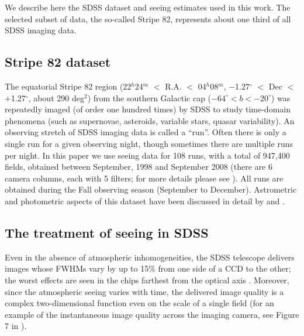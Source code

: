 

We describe here the SDSS dataset and seeing estimates used in this work. The
selected subset of data, the so-called Stripe 82, represents about one third of
all SDSS imaging data. 

\subsection{Stripe 82 dataset} 

The equatorial Stripe 82 region (22$^h$24$^m$ $<$ R.A. $<$ 04$^h$08$^m$, 
$-$1.27$^\circ$  $<$ Dec $<$ $+$1.27$^\circ$, about 
290 deg$^2$) from the southern Galactic cap ($-64^\circ < b <  -20^\circ$) was repeatedly imaged (of order
one hundred times) by SDSS to study time-domain phenomena (such as supernovae, asteroids, variable stars, quasar 
variability).  An observing stretch of SDSS imaging data is called a ``run''. Often there is only a single
run for a given observing night, though sometimes there are multiple
runs per night. In this paper we use seeing data for 
108 runs, with a total of 947,400 fields, obtained between September,
1998 and September 2008 (there are 6 camera columns, each with 5 filters; for more
details please see \citealt{Gunn2006}). All runs are obtained during the Fall observing season (September to 
December). Astrometric and photometric aspects of this dataset have been discussed in detail by 
\cite{Ivezic2007} and \cite{Sesar2007}. 


\subsection{The treatment of seeing in SDSS}
 
Even in the absence of atmospheric inhomogeneities, the SDSS telescope delivers images whose 
FWHMs vary by up to 15\% from one side of a CCD to the other; the worst effects are seen in 
the chips farthest from the optical axis \citep{Gunn2006}. Moreover, since the atmospheric 
seeing varies with time, the delivered image quality is a complex two-dimensional function 
even on the scale of a single field (for an example of the instantaneous image quality across 
the imaging camera, see Figure 7 in \citealt{SDSSEDR}). 
 
